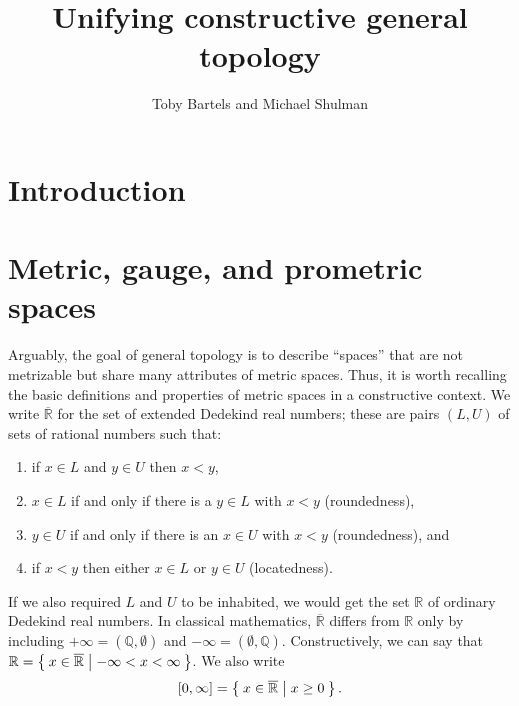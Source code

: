 \documentclass{article}
\title{Unifying constructive general topology}
\author{Toby Bartels and Michael Shulman}
\def\R{\mathbb{R}}
\def\Re{\overline{\mathbb{R}}}
\def\Rp{[0,\infty]}
\begin{document}
\maketitle

\section{Introduction}
\label{sec:intro}

\section{Metric, gauge, and prometric spaces}
\label{sec:metric}

Arguably, the goal of general topology is to describe ``spaces'' that are not metrizable but share many attributes of metric spaces.
Thus, it is worth recalling the basic definitions and properties of metric spaces in a constructive context.
We write $\Re$ for the set of extended Dedekind real numbers; these are pairs $(L,U)$ of sets of rational numbers such that:
\begin{enumerate}
\item if $x\in L$ and $y\in U$ then $x<y$,
\item $x\in L$ if and only if there is a $y\in L$ with $x<y$ (roundedness),
\item $y\in U$ if and only if there is an $x\in U$ with $x<y$ (roundedness), and
\item if $x<y$ then either $x\in L$ or $y\in U$ (locatedness).
\end{enumerate}
If we also required $L$ and $U$ to be inhabited, we would get the set $\R$ of ordinary Dedekind real numbers.
In classical mathematics, $\Re$ differs from $\R$ only by including $+\infty = (\mathbb{Q},\emptyset)$ and $-\infty = (\emptyset,\mathbb{Q})$.
Constructively, we can say that $\R = \setof{ x\in \Re | -\infty < x < \infty }$.
We also write
\[\Rp = \setof{x\in\Re | x\ge 0 }.\]
\end{document}
